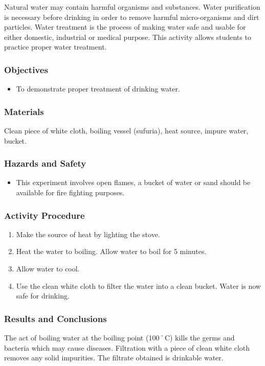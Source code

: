 Natural water may contain harmful organisms and substances. Water purification is necessary before drinking in order to remove harmful micro-organisms and dirt particles. Water treatment is the process of making water safe and usable for either domestic, industrial or medical purpose. This activity allows students to practice proper water treatment.



\subsubsection*{Objectives}
\begin{itemize}
\item{To demonstrate proper treatment of drinking water.}
\end{itemize}

\subsubsection*{Materials}
Clean piece of white cloth, boiling vessel (sufuria), heat source, impure water, bucket.

\subsubsection*{Hazards and Safety}
\begin{itemize}
\item{This experiment involves open flames, a bucket of water or sand should be available for fire fighting purposes.}
\end{itemize}


\subsubsection*{Activity Procedure}
\begin{enumerate}
\item{Make the source of heat by lighting the stove.}
\item{Heat the water to boiling. Allow water to boil for 5 minutes.}
\item{Allow water to cool.}
\item{Use the clean white cloth to filter the water into a clean bucket. Water is now safe for drinking.}
\end{enumerate}

\subsubsection*{Results and Conclusions}
The act of boiling water at the boiling point (100˚C) kills the germs and bacteria which may cause diseases. Filtration with a piece of clean white cloth removes any solid impurities. The filtrate obtained is drinkable water.

